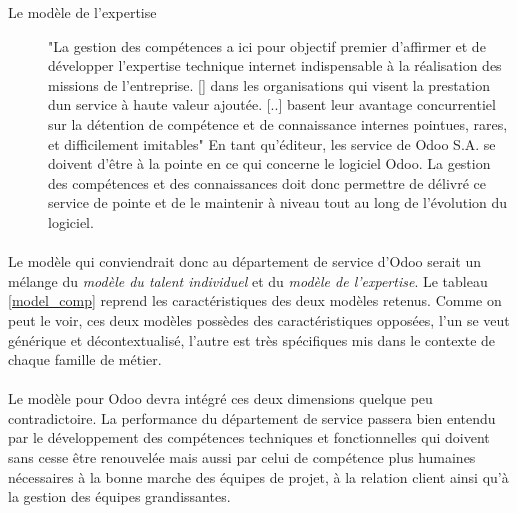 \begin{description}
  \item[Le modèle de l'expertise]
  "La gestion des compétences a ici pour objectif premier d'affirmer et de développer l'expertise technique internet indispensable à la réalisation des missions de l'entreprise. [] dans les organisations qui visent la prestation dun service à haute valeur ajoutée. [..] basent leur avantage concurrentiel sur la détention de compétence et de connaissance internes pointues, rares, et difficilement imitables"\citep[pp.45]{delobbe} En tant qu'éditeur, les service de Odoo S.A. se doivent d'être à la pointe en ce qui concerne le logiciel Odoo. La gestion des compétences et des connaissances doit donc permettre de délivré ce service de pointe et de le maintenir à niveau tout au long de l'évolution du logiciel. 
\end{description}


\paragraph{}Le modèle qui conviendrait donc au département de service d'Odoo serait un mélange du \textit{modèle du talent individuel} et du \textit{modèle de l'expertise}. Le tableau \ref{model_comp} reprend les caractéristiques des deux modèles retenus. Comme on peut le voir, ces deux modèles possèdes des caractéristiques opposées, l'un se veut générique et décontextualisé, l'autre est très spécifiques mis dans le contexte de chaque famille de métier. 

\paragraph{}Le modèle pour Odoo devra intégré ces deux dimensions quelque peu contradictoire.
La performance du département de service passera bien entendu par le développement des compétences techniques et fonctionnelles qui doivent sans cesse être renouvelée mais aussi par celui de compétence plus humaines nécessaires à la bonne marche des équipes de projet, à la relation client ainsi qu'à la gestion des équipes grandissantes.



